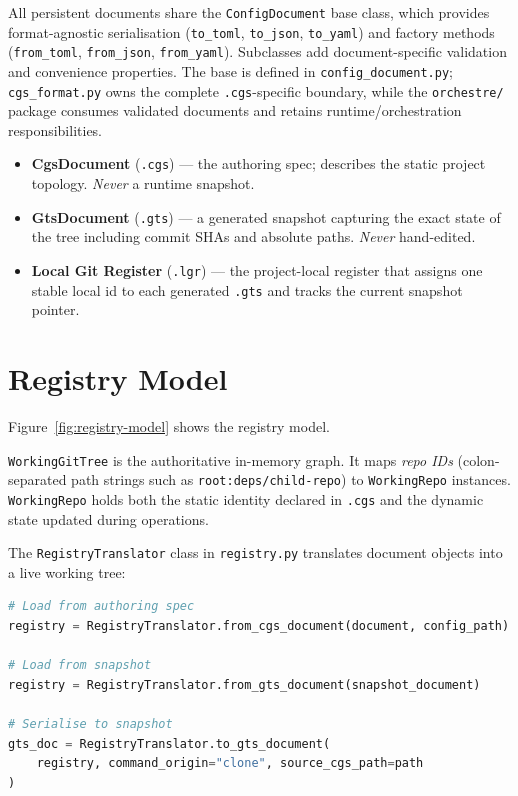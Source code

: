 All persistent documents share the \texttt{ConfigDocument} base class, which
provides format-agnostic serialisation (\texttt{to\_toml}, \texttt{to\_json},
\texttt{to\_yaml}) and factory methods (\texttt{from\_toml}, \texttt{from\_json},
\texttt{from\_yaml}).  Subclasses add document-specific validation and
convenience properties.  The base is defined in
\texttt{config\_document.py}; \texttt{cgs\_format.py} owns the complete
\texttt{.cgs}-specific boundary, while the \texttt{orchestre/} package consumes validated
documents and retains runtime/orchestration responsibilities.

\begin{itemize}
  \item \textbf{CgsDocument} (\texttt{.cgs}) — the authoring spec; describes
    the static project topology.  \emph{Never} a runtime snapshot.
  \item \textbf{GtsDocument} (\texttt{.gts}) — a generated snapshot capturing
    the exact state of the tree including commit SHAs and absolute paths.
    \emph{Never} hand-edited.
  \item \textbf{Local Git Register} (\texttt{.lgr}) — the project-local
    register that assigns one stable local id to each generated \texttt{.gts}
    and tracks the current snapshot pointer.
\end{itemize}

\section{Registry Model}
\label{sec:registry-model}

Figure~\ref{fig:registry-model} shows the registry model.

\texttt{WorkingGitTree} is the authoritative in-memory graph.  It maps
\emph{repo IDs} (colon-separated path strings such as
\texttt{root:deps/child-repo}) to \texttt{WorkingRepo} instances.
\texttt{WorkingRepo} holds both the static identity declared in
\texttt{.cgs} and the dynamic state updated during operations.

The \texttt{RegistryTranslator} class in \texttt{registry.py} translates document objects into a
live working tree:

\begin{lstlisting}[language=Python]
# Load from authoring spec
registry = RegistryTranslator.from_cgs_document(document, config_path)

# Load from snapshot
registry = RegistryTranslator.from_gts_document(snapshot_document)

# Serialise to snapshot
gts_doc = RegistryTranslator.to_gts_document(
    registry, command_origin="clone", source_cgs_path=path
)
\end{lstlisting}

